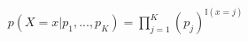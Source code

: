 $$
\begin{align*}
p(X=x | p_1, ..., p_K) = \prod_{j=1}^{K}(p_j)^{\mathbb{I}(x = j)}
\end{align*}
$$
